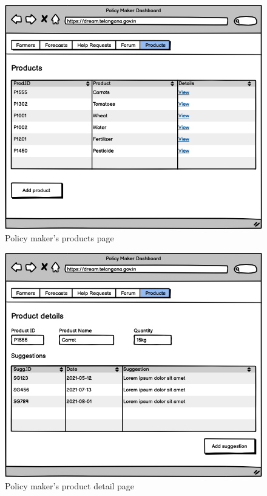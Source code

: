 \documentclass[10pt]{article} %
\begin{document}
\begin{figure}[h!]
    \centering
    \centerline{\includegraphics[scale=0.54]{images/uimockups/pm_products.png}}
    \caption{Policy maker's products page}
    \label{fig:ui_pm_products}
\end{figure}
\newpage

\begin{figure}[h!]
    \centering
    \centerline{\includegraphics[scale=0.54]{images/uimockups/pm_productdetail.png}}
    \caption{Policy maker's product detail page}
    \label{fig:ui_pm_productdetail}
\end{figure}
\newpage
\end{document}
